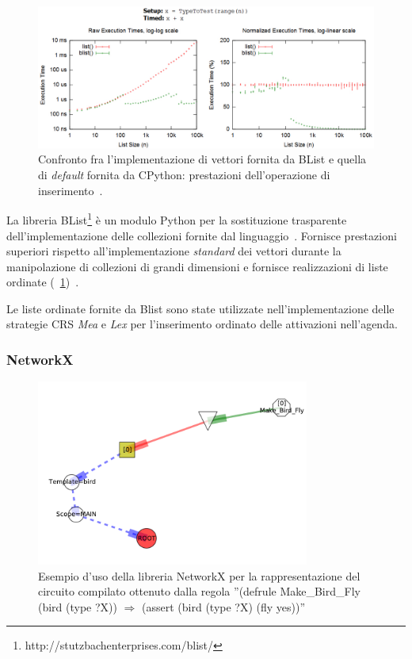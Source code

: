 \begin{figure}[h]
\centering
\includegraphics[width=1\textwidth]{Immagini/Capitolo3/BList-comparison.pdf}
\caption[Confronto fra l'implementazione di vettori fornita da BList e di \emph{default}]{Confronto fra l'implementazione di vettori fornita da BList e quella di \emph{default} fornita da CPython: prestazioni dell'operazione di inserimento~\cite{blist-prest}.}\label{fig:blist-comparison}
\end{figure}

La libreria BList\footnote{http://stutzbachenterprises.com/blist/} è un modulo Python per la sostituzione trasparente dell'implementazione delle collezioni fornite dal linguaggio~\cite{blist-manual}. Fornisce prestazioni superiori rispetto all'implementazione \emph{standard} dei vettori durante la manipolazione di collezioni di grandi dimensioni e fornisce realizzazioni di liste ordinate (\figurename~\ref{fig:blist-comparison})~\cite{blist-prest}.

Le liste ordinate fornite da Blist sono state utilizzate nell'implementazione delle strategie CRS \emph{Mea} e \emph{Lex} per l'inserimento ordinato delle attivazioni nell'agenda.


\subsubsection{NetworkX}

\begin{figure}
\centering
\includegraphics[width=0.8\textwidth]{Immagini/Capitolo3/NetworkX-example.pdf}
\caption[Esempio d'uso della libreria NetworkX]{Esempio d'uso della libreria NetworkX per la rappresentazione del circuito compilato ottenuto dalla regola ''(defrule Make\_Bird\_Fly (bird (type ?X)) $\Rightarrow$ (assert (bird (type ?X) (fly yes))''}\label{fig:networkx-example}
\end{figure}

